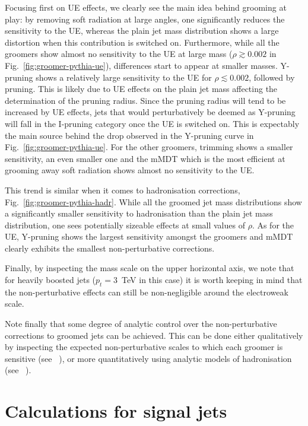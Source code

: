 Focusing first on UE effects, we clearly see the main idea behind
grooming at play: by removing  soft radiation at large angles, one
significantly reduces the sensitivity to the UE, whereas the plain jet
mass distribution shows a large distortion when this contribution is switched on.
%
Furthermore, while all the groomers show almost no sensitivity to the
UE at large mass ($\rho\gtrsim 0.002$ in
Fig.~\ref{fig:groomer-pythia-ue}), differences start to appear at
smaller masses.  Y-pruning shows a relatively large sensitivity to the UE
for $\rho\lesssim 0.002$, followed by pruning. This is likely due to
UE effects on the plain jet mass affecting the determination of the
pruning radius. Since the pruning radius will tend to be increased by
UE effects, jets that would perturbatively be deemed as Y-pruning will
fall in the I-pruning category once the UE is switched on. This is
expectably the main source behind the drop observed in the Y-pruning
curve in Fig.~\ref{fig:groomer-pythia-ue}.
%
For the other groomers, trimming shows a smaller sensitivity, \SD 
an even smaller one and the mMDT which is the most efficient at
grooming away soft radiation shows almost no
sensitivity to the UE.

This trend is similar when it comes to hadronisation corrections,
Fig.~\ref{fig:groomer-pythia-hadr}.
%
While all the groomed jet mass distributions show a significantly
smaller sensitivity to hadronisation than the plain jet mass distribution,
one sees potentially sizeable effects at small values of $\rho$.
%
As for the UE, Y-pruning shows the largest sensitivity
amongst the groomers and mMDT clearly exhibits
the smallest non-perturbative corrections.

Finally, by inspecting the mass scale on the upper horizontal axis, we note that 
for heavily boosted jets ($p_t=3$~TeV in this case) it is worth keeping in mind that the
non-perturbative effects can still be non-negligible around the
electroweak scale.

Note finally that some degree of analytic control over the
non-perturbative corrections to groomed jets can be achieved. This can
be done either qualitatively by inspecting the expected
non-perturbative scales to which each groomer is sensitive (see
\eg~\cite{Dasgupta:2013ihk}), or more quantitatively using analytic
models of hadronisation (see
\eg~\cite{Dasgupta:2007wa,Dasgupta:2013ihk,Marzani:2017kqd}).

\section{Calculations for signal jets}\label{sec:calc-groomed-mass-signal}

